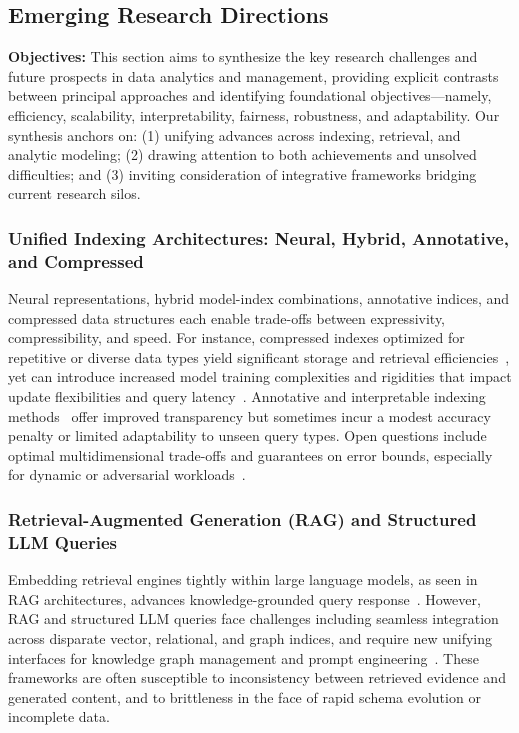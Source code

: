 \documentclass[sigconf]{acmart}
\begin{document}
\subsection{Emerging Research Directions}

\textbf{Objectives:} This section aims to synthesize the key research challenges and future prospects in data analytics and management, providing explicit contrasts between principal approaches and identifying foundational objectives---namely, efficiency, scalability, interpretability, fairness, robustness, and adaptability. Our synthesis anchors on: (1) unifying advances across indexing, retrieval, and analytic modeling; (2) drawing attention to both achievements and unsolved difficulties; and (3) inviting consideration of integrative frameworks bridging current research silos.

\subsubsection*{Unified Indexing Architectures: Neural, Hybrid, Annotative, and Compressed}
Neural representations, hybrid model-index combinations, annotative indices, and compressed data structures each enable trade-offs between expressivity, compressibility, and speed. For instance, compressed indexes optimized for repetitive or diverse data types yield significant storage and retrieval efficiencies~\cite{ref110,ref111,ref115,ref118}, yet can introduce increased model training complexities and rigidities that impact update flexibilities and query latency~\cite{ref110,ref111}. Annotative and interpretable indexing methods~\cite{ref115} offer improved transparency but sometimes incur a modest accuracy penalty or limited adaptability to unseen query types. Open questions include optimal multidimensional trade-offs and guarantees on error bounds, especially for dynamic or adversarial workloads~\cite{ref110,ref111}.

\subsubsection*{Retrieval-Augmented Generation (RAG) and Structured LLM Queries}
Embedding retrieval engines tightly within large language models, as seen in RAG architectures, advances knowledge-grounded query response~\cite{ref110,ref115,ref116}. However, RAG and structured LLM queries face challenges including seamless integration across disparate vector, relational, and graph indices, and require new unifying interfaces for knowledge graph management and prompt engineering~\cite{ref110,ref115}. These frameworks are often susceptible to inconsistency between retrieved evidence and generated content, and to brittleness in the face of rapid schema evolution or incomplete data.
\end{document}
